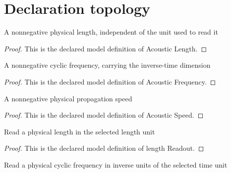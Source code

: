 \section{Declaration topology}
\begin{definition}
  \label{def:physics:phyx-mini-0330:phyxminiproblems-problemphyxmini0330-acousticlength}
  A nonnegative physical length, independent of the unit used to read it
\end{definition}
\begin{proof}
  This is the declared model definition of Acoustic Length.
\end{proof}
\begin{definition}
  \label{def:physics:phyx-mini-0330:phyxminiproblems-problemphyxmini0330-acousticfrequency}
  A nonnegative cyclic frequency, carrying the inverse-time dimension
\end{definition}
\begin{proof}
  This is the declared model definition of Acoustic Frequency.
\end{proof}
\begin{definition}
  \label{def:physics:phyx-mini-0330:phyxminiproblems-problemphyxmini0330-acousticspeed}
  A nonnegative physical propagation speed
\end{definition}
\begin{proof}
  This is the declared model definition of Acoustic Speed.
\end{proof}
\begin{definition}
  \label{def:physics:phyx-mini-0330:phyxminiproblems-problemphyxmini0330-lengthreadout}
  Read a physical length in the selected length unit
\end{definition}
\begin{proof}
  This is the declared model definition of length Readout.
\end{proof}
\begin{definition}
  \label{def:physics:phyx-mini-0330:phyxminiproblems-problemphyxmini0330-frequencyreadout}
  Read a physical cyclic frequency in inverse units of the selected time unit
\end{definition}
